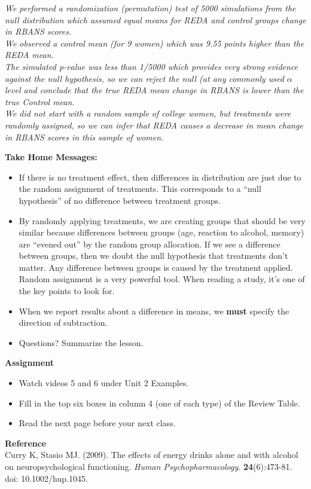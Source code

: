\begin{enumerate}
\begin{key}
  {\it 
We performed a randomization (permutation) test of 5000 simulations
from the null distribution which assumed equal means for REDA and
control groups change in RBANS scores.\\
We observed a control mean (for 9 women) which was 9.55 points higher
than the REDA mean.\\
The simulated p-value was less than 1/5000 which provides very strong
evidence against the null hypothesis, so we can reject the null (at
any commonly used $\alpha$ level and conclude that the true REDA mean
change in RBANS is lower than the true Control mean.\\
We did not start with a random sample of college women, but treatments
were randomly assigned, so we can infer that REDA causes a decrease in
mean change in RBANS scores in this sample of women.
}
\end{key}


 \end{enumerate}


{\sf\bf Take Home Messages:}
\begin{itemize}
  \item 
  If there is no treatment effect, then differences in distribution
  are just due to the random assignment of treatments.  This
  corresponds to a ``null hypothesis'' of no difference between
  treatment groups.
\item  By randomly applying treatments, we are creating groups that
  should be very similar because differences between groups (age,
  reaction to alcohol, memory) are “evened out” by the random group
  allocation. If we see a difference between groups, then we doubt the
  null hypothesis that treatments don't matter.  Any difference
  between groups is caused by the treatment applied.  Random
  assignment is a very powerful tool.  When reading a study, it's one
  of the key points to look for. 
 \item When we report results about a difference in means, we {\bf
     must} specify the direction of subtraction. 
 \item 
  Questions? Summarize  the  lesson. \vfill

\end{itemize}



\noindent
{\bf Assignment} \vspace{-.2in}
\begin{itemize}
  \item Watch videos 5 and 6 under Unit 2 Examples.
\item Fill in the top six  boxes in column 4 (one  of each type) of
  the Review Table.   
\item Read the next page before your next class.
\end{itemize}


{\sf\bf Reference}
\\
 Curry K, Stasio MJ.  (2009). The effects of energy drinks alone and with
 alcohol on neuropsychological functioning. {\it Human  Psychopharmacology}.
{\bf 24}(6):473-81. doi: 10.1002/hup.1045. 


